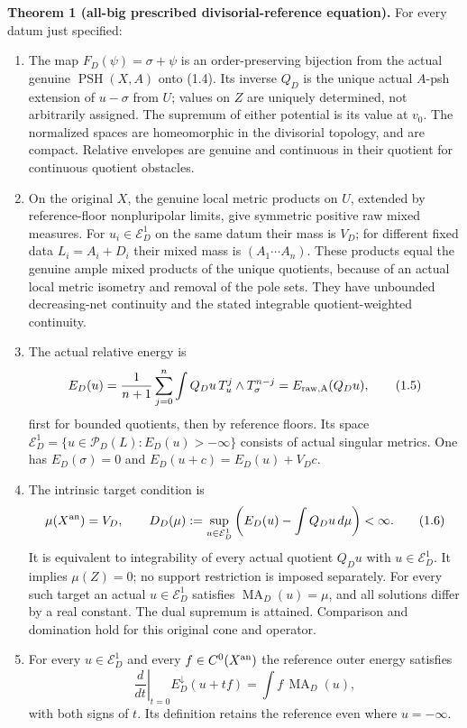 \documentclass[
  10pt,
]{article}
\providecommand{\tightlist}{%
  \setlength{\itemsep}{0pt}\setlength{\parskip}{0pt}}
\begin{document}
\textbf{Theorem 1 (all-big prescribed divisorial-reference equation).}
For every datum just specified:

\begin{enumerate}
\def\labelenumi{\arabic{enumi}.}
\tightlist
\item
  The map \(F_D(\psi)=\sigma+\psi\) is an order-preserving bijection
  from the actual genuine \(\operatorname{PSH}(X,A)\) onto (1.4). Its
  inverse \(Q_D\) is the unique actual \(A\)-psh extension of
  \(u-\sigma\) from \(U\); values on \(Z\) are uniquely determined, not
  arbitrarily assigned. The supremum of either potential is its value at
  \(v_0\). The normalized spaces are homeomorphic in the divisorial
  topology, and are compact. Relative envelopes are genuine and
  continuous in their quotient for continuous quotient obstacles.
\item
  On the original \(X\), the genuine local metric products on \(U\),
  extended by reference-floor nonpluripolar limits, give symmetric
  positive raw mixed measures. For \(u_i\in\mathcal E_D^1\) on the same
  datum their mass is \(V_D\); for different fixed data \(L_i=A_i+D_i\)
  their mixed mass is \((A_1\cdots A_n)\). These products equal the
  genuine ample mixed products of the unique quotients, because of an
  actual local metric isometry and removal of the pole sets. They have
  unbounded decreasing-net continuity and the stated integrable
  quotient-weighted continuity.
\item
  The actual relative energy is
  \[E_D(u)=\frac1{n+1}\sum_{j=0}^n\int Q_Du\,T_u^j\wedge T_\sigma^{n-j}
   =E_{\rm raw,A}(Q_Du),\tag{1.5}\] first for bounded quotients, then by
  reference floors. Its space
  \(\mathcal E_D^1=\{u\in\mathcal P_D(L):E_D(u)>-\infty\}\) consists of
  actual singular metrics. One has \(E_D(\sigma)=0\) and
  \(E_D(u+c)=E_D(u)+V_Dc\).
\item
  The intrinsic target condition is \[\mu(X^{\rm an})=V_D,\qquad
  D_D(\mu):=\sup_{u\in\mathcal E_D^1}
  \left(E_D(u)-\int Q_Du\,d\mu\right)<\infty.\tag{1.6}\] It is
  equivalent to integrability of every actual quotient \(Q_Du\) with
  \(u\in\mathcal E_D^1\). It implies \(\mu(Z)=0\); no support
  restriction is imposed separately. For every such target an actual
  \(u\in\mathcal E_D^1\) satisfies \(\operatorname{MA}_D(u)=\mu\), and
  all solutions differ by a real constant. The dual supremum is
  attained. Comparison and domination hold for this original cone and
  operator.
\item
  For every \(u\in\mathcal E_D^1\) and every \(f\in C^0(X^{\rm an})\)
  the reference outer energy satisfies
  \[\left.\frac d{dt}\right|_{t=0}E_D^{\downarrow}(u+tf)
   =\int f\,\operatorname{MA}_D(u),\tag{1.7}\] with both signs of \(t\).
  Its definition retains the reference even where \(u=-\infty\).
\end{enumerate}
\end{document}
